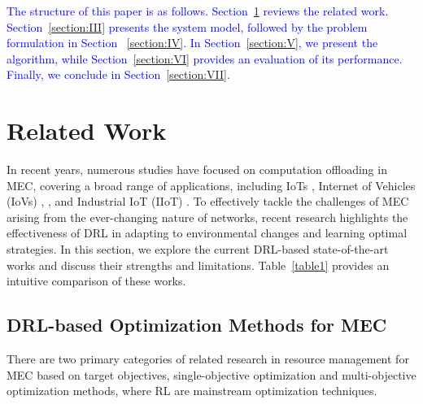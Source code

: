 \documentclass[12pt,draftclsnofoot,onecolumn]{IEEEtran}
\begin{document}
\textcolor{blue}{The structure of this paper is as follows. Section~\ref{section:II} reviews the related work. Section~\ref{section:III} presents the system model, followed by the problem formulation in Section ~\ref{section:IV}. In Section~\ref{section:V}, we present the algorithm, while Section~\ref{section:VI} provides an evaluation of its performance. Finally, we conclude in Section~\ref{section:VII}.}


	
	
	\section{Related Work}
	\label{section:II}
		In recent years, numerous studies have focused on computation offloading in MEC, covering a broad range of applications, including IoTs \cite{zhang2023multi}, Internet of Vehicles (IoVs) \cite{lin2022multi}, \cite{wei2023many}, and Industrial IoT (IIoT) \cite{yuan2023adaptive}. 
		To effectively tackle the challenges of MEC arising from the ever-changing nature of networks, recent research highlights the effectiveness of DRL in adapting to environmental changes and learning optimal strategies. In this section, we explore the current DRL-based state-of-the-art works and discuss their strengths and limitations. Table~\ref{table1} provides an intuitive comparison of these works.
		\subsection{DRL-based Optimization Methods for MEC} 
		
		There are two primary categories of related research in resource management for MEC based on target objectives, single-objective optimization and multi-objective optimization methods, where RL are mainstream optimization techniques.
\end{document}
